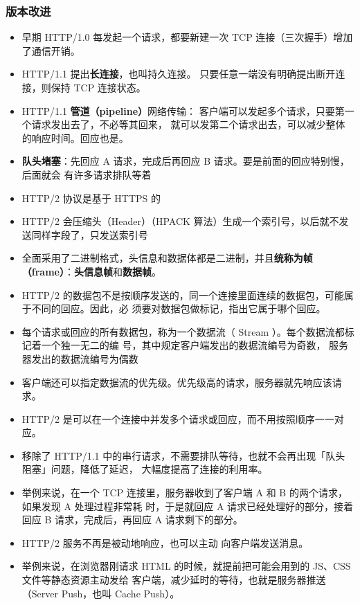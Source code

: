 \subsubsection{版本改进}
\begin{itemize}
\item 早期 HTTP/1.0 每发起一个请求，都要新建一次 TCP 连接（三次握手）增加了通信开销。
\item HTTP/1.1 提出\textbf{长连接}，也叫持久连接。 只要任意一端没有明确提出断开连接，则保持 TCP 连接状态。
\item HTTP/1.1 \textbf{管道（pipeline）}网络传输： 客户端可以发起多个请求，只要第一个请求发出去了，不必等其回来， 就可以发第二个请求出去，可以减少整体的响应时间。回应也是。
\item \textbf{队头堵塞}：先回应 A 请求，完成后再回应 B 请求。要是前面的回应特别慢，后面就会 有许多请求排队等着
\item HTTP/2 协议是基于 HTTPS 的
\item HTTP/2 会压缩头（Header）（HPACK 算法）生成一个索引号，以后就不发送同样字段了，只发送索引号
\item 全面采用了二进制格式，头信息和数据体都是二进制，并且\textbf{统称为帧（frame）}：\textbf{头信息帧}和\textbf{数据帧}。
\item HTTP/2 的数据包不是按顺序发送的，同一个连接里面连续的数据包，可能属于不同的回应。因此，必 须要对数据包做标记，指出它属于哪个回应。
\item 每个请求或回应的所有数据包，称为一个数据流（    Stream  ）。每个数据流都标记着一个独一无二的编 号，其中规定客户端发出的数据流编号为奇数，  服务器发出的数据流编号为偶数
\item 客户端还可以指定数据流的优先级。优先级高的请求，服务器就先响应该请求。
\item HTTP/2 是可以在一个连接中并发多个请求或回应，而不用按照顺序一一对应。
\item 移除了 HTTP/1.1 中的串行请求，不需要排队等待，也就不会再出现「队头阻塞」问题，降低了延迟， 大幅度提高了连接的利用率。
\item 举例来说，在一个 TCP 连接里，服务器收到了客户端 A 和 B 的两个请求，如果发现 A 处理过程非常耗 时，于是就回应 A 请求已经处理好的部分，接着回应 B 请求，完成后，再回应 A 请求剩下的部分。
\item HTTP/2 服务不再是被动地响应，也可以主动 向客户端发送消息。
\item 举例来说，在浏览器刚请求 HTML 的时候，就提前把可能会用到的 JS、CSS 文件等静态资源主动发给 客户端，减少延时的等待，也就是服务器推送（Server Push，也叫 Cache Push）。
\end{itemize}

